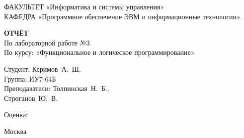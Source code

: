\begin{titlepage}
{	{\doublespacing \small \raggedright ФАКУЛЬТЕТ \hspace{25mm} «Информатика и системы управления»\\
	КАФЕДРА \hspace{5mm} «Программное обеспечение ЭВМ и информационные технологии»\\}

	\vspace{30mm}

	\textbf{ОТЧЁТ}\\
	По лабораторной работе №3\\
	По курсу: «Функциональное и логическое программирование»\\

	\vspace{60mm}

	\hspace{70mm} Студент:       \hfill Керимов~А.~Ш.\\
	\hspace{70mm} Группа:        \hfill ИУ7-64Б\\
	\hspace{70mm} Преподаватели: \hfill Толпинская~Н.~Б.,\\
	                             \hfill Строганов~Ю.~В.\\
	{\raggedright \hspace{70mm} Оценка: \hfill \hrulefill\\}

	\vfill

	Москва\\
	\the\year\\}
\end{titlepage}
